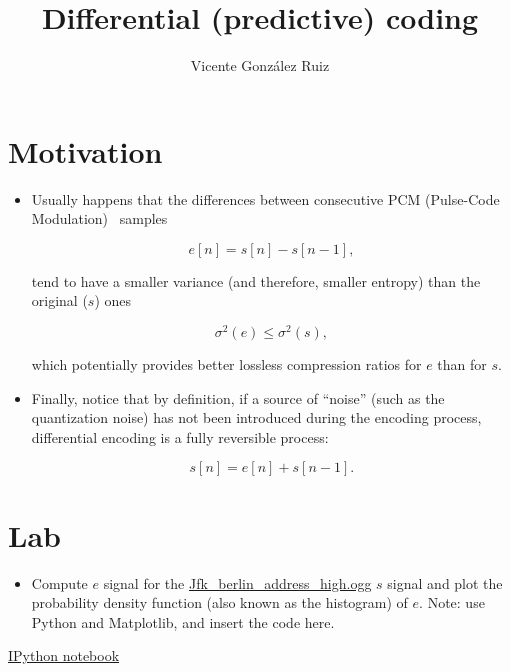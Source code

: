 
\title{Differential (predictive) coding}

\author{Vicente González Ruiz}

\maketitle

\section{Motivation}
\begin{itemize}
\item
  Usually happens that the differences between consecutive PCM
  (Pulse-Code Modulation)~\cite{oppenheim1999discrete, oppenheim2014discrete} samples

  \[
    e[n] = s[n] - s[n-1],
  \]

  tend to have a smaller variance (and therefore, smaller entropy) than
  the original (\(s\)) ones

  \[
    \sigma^2(e) \leq \sigma^2(s),
  \]

  which potentially provides better lossless compression ratios for
  \(e\) than for \(s\).
\item
  Finally, notice that by definition, if a source of ``noise'' (such as
  the quantization noise) has not been introduced during the encoding
  process, differential encoding is a fully reversible process:

  \[
    s[n] = e[n] + s[n-1].
  \]
\end{itemize}

\section{Lab}

\begin{itemize}
\tightlist
\item
  Compute \(e\) signal for the
  \href{https://upload.wikimedia.org/wikipedia/commons/3/3a/Jfk_berlin_address_high.ogg}{Jfk\_berlin\_address\_high.ogg}
  \(s\) signal and plot the probability density function (also known as
  the histogram) of \(e\). Note: use Python and Matplotlib, and insert
  the code here.
\end{itemize}

\href{https://nbviewer.jupyter.org/github/vicente-gonzalez-ruiz/differential_coding/blob/master/DPCM.ipynb}{IPython notebook}

